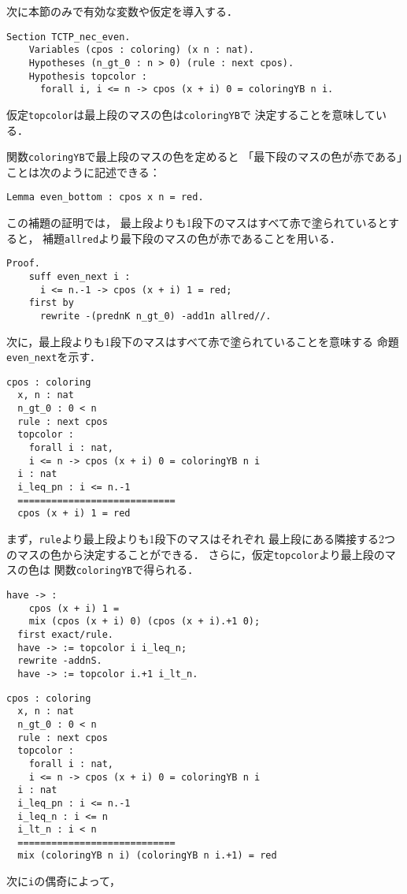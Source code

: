 次に本節のみで有効な変数や仮定を導入する．
\begin{lstlisting}[language=Coq]
  Section TCTP_nec_even.
    Variables (cpos : coloring) (x n : nat).
    Hypotheses (n_gt_0 : n > 0) (rule : next cpos).
    Hypothesis topcolor :
      forall i, i <= n -> cpos (x + i) 0 = coloringYB n i.
\end{lstlisting}
仮定{\tt{topcolor}}は最上段のマスの色は{\tt{coloringYB}}で
決定することを意味している．

関数{\tt{coloringYB}}で最上段のマスの色を定めると
「最下段のマスの色が赤である」ことは次のように記述できる：
\begin{lstlisting}[language=Coq]
  Lemma even_bottom : cpos x n = red.
\end{lstlisting}
この補題の証明では，
最上段よりも1段下のマスはすべて赤で塗られているとすると，
補題{\tt{allred}}より最下段のマスの色が赤であることを用いる．
\begin{lstlisting}[language=Coq]
  Proof.
    suff even_next i :
      i <= n.-1 -> cpos (x + i) 1 = red;
    first by
      rewrite -(prednK n_gt_0) -add1n allred//.
\end{lstlisting}
次に，最上段よりも1段下のマスはすべて赤で塗られていることを意味する
命題{\tt{even\_next}}を示す．
\begin{lstlisting}[language=Coq]
  cpos : coloring
  x, n : nat
  n_gt_0 : 0 < n
  rule : next cpos
  topcolor :
    forall i : nat,
    i <= n -> cpos (x + i) 0 = coloringYB n i
  i : nat
  i_leq_pn : i <= n.-1
  ============================
  cpos (x + i) 1 = red
\end{lstlisting}
まず，{\tt{rule}}より最上段よりも1段下のマスはそれぞれ
最上段にある隣接する2つのマスの色から決定することができる．
さらに，仮定{\tt{topcolor}}より最上段のマスの色は
関数{\tt{coloringYB}}で得られる．
\begin{lstlisting}[language=Coq]
  have -> :
    cpos (x + i) 1 =
    mix (cpos (x + i) 0) (cpos (x + i).+1 0);
  first exact/rule.
  have -> := topcolor i i_leq_n;
  rewrite -addnS.
  have -> := topcolor i.+1 i_lt_n.
\end{lstlisting}
\begin{lstlisting}[language=Coq]
  cpos : coloring
  x, n : nat
  n_gt_0 : 0 < n
  rule : next cpos
  topcolor :
    forall i : nat,
    i <= n -> cpos (x + i) 0 = coloringYB n i
  i : nat
  i_leq_pn : i <= n.-1
  i_leq_n : i <= n
  i_lt_n : i < n
  ============================
  mix (coloringYB n i) (coloringYB n i.+1) = red
\end{lstlisting}
次に{\tt{i}}の偶奇によって，
